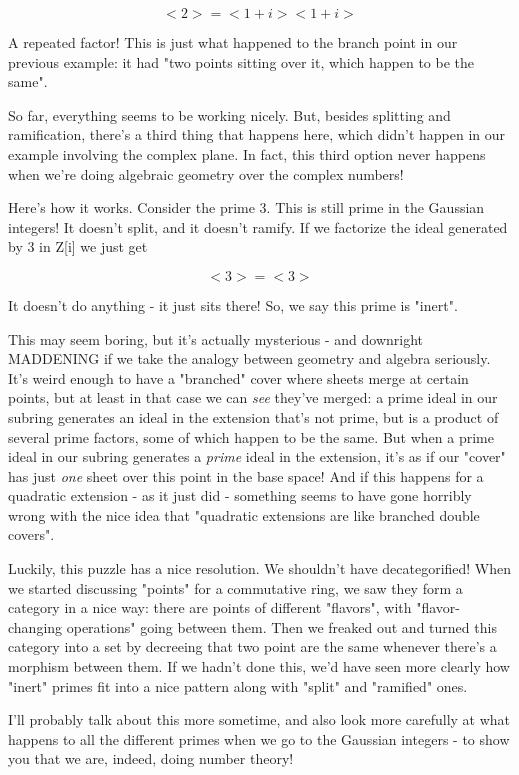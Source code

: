 $$

<2> = <1 + i> <1 + i>
$$
    

A repeated factor!  This is just what happened to the branch point in 
our previous example: it had "two points sitting over it, which happen 
to be the same".  

So far, everything seems to be working nicely.  But, besides splitting 
and ramification, there's a third thing that happens here, which didn't 
happen in our example involving the complex plane.  In fact, this third 
option never happens when we're doing algebraic geometry over the complex 
numbers!  

Here's how it works.  Consider the prime 3.  This is still prime in the
Gaussian integers!  It doesn't split, and it doesn't ramify.  If we
factorize the ideal generated by 3 in Z[i] we just get


$$

<3> = <3>
$$
    

It doesn't do anything - it just sits there!
So, we say this prime is "inert".

This may seem boring, but it's actually mysterious - and downright 
MADDENING if we take the analogy between geometry and algebra seriously.
It's weird enough to have a "branched" cover where sheets merge at 
certain points, but at least in that case we can \emph{see} they've merged:
a prime ideal in our subring generates an ideal in the extension that's 
not prime, but is a product of several prime factors, some of which 
happen to be the same.  But when a prime ideal in our subring generates 
a \emph{prime}
ideal in the extension, it's as if our "cover" has just \emph{one}
sheet over this point in the base space!   And if this happens for a 
quadratic extension - as it just did - something seems to have gone 
horribly wrong with the nice idea that "quadratic extensions are like 
branched double covers".

Luckily, this puzzle has a nice resolution.  We shouldn't have
decategorified!  When we started discussing "points" for a commutative
ring, we saw they form a category in a nice way: there are points of
different "flavors", with "flavor-changing operations" going between
them.  Then we freaked out and turned this category into a set by
decreeing that two point are the same whenever there's a morphism 
between them.  If we hadn't done this, we'd have seen more clearly how 
"inert" primes fit into a nice pattern along with "split" and "ramified" 
ones. 

I'll probably talk about this more sometime, and also look more carefully
at what happens to all the different primes when we go to the Gaussian
integers - to show you that we are, indeed, doing number theory!

